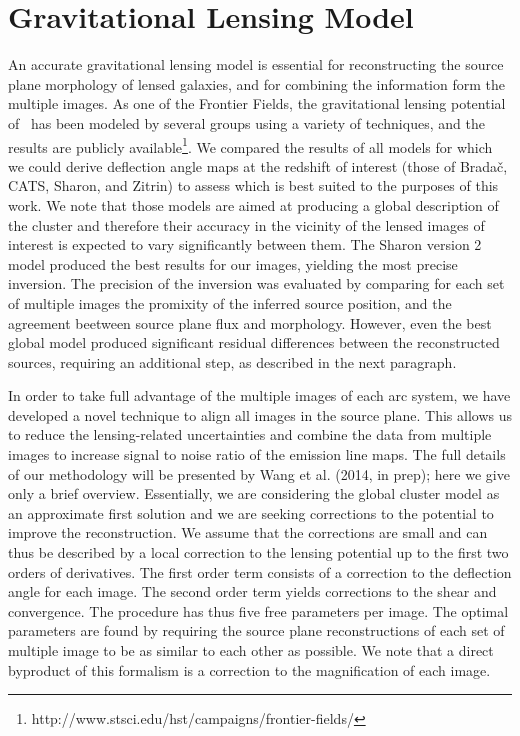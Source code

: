 \section{Gravitational Lensing Model}\label{sec:model}

An accurate gravitational lensing model is essential for reconstructing the source plane morphology of lensed
galaxies, and for combining the information form the multiple images. As one of the Frontier Fields, the
gravitational lensing potential of \clyi\ has been modeled by several groups using a variety of techniques, and
the results are publicly available\footnote{http://www.stsci.edu/hst/campaigns/frontier-fields/}. We compared the
results of all models for which we could derive deflection angle maps at the redshift of interest (those of
Brada{\v c}, CATS, Sharon, and Zitrin) to assess which is best suited to the purposes of this work. We note that
those models are aimed at producing a global description of the cluster and therefore their accuracy in the
vicinity of the lensed images of interest is expected to vary significantly between them. The Sharon version 2
model \citep{Johnson2014} produced the best results for our images, yielding the most precise inversion. The
precision of the inversion was evaluated by comparing for each set of multiple images the promixity of the
inferred source position, and the agreement beetween source plane flux and morphology.  However, even the best
global model produced significant residual differences between the reconstructed sources, requiring an additional
step, as described in the next paragraph.

In order to take full advantage of the multiple images of each arc system, we have developed a novel technique to
align all images in the source plane. This allows us to reduce the lensing-related uncertainties and combine the
data from multiple images to increase signal to noise ratio of the emission line maps. The full details of our
methodology will be presented by Wang et al. (2014, in prep); here we give only a brief overview. Essentially, we
are considering the global cluster model as an approximate first solution and we are seeking corrections to the
potential to improve the reconstruction. We assume that the corrections are small and can thus be described by a
local correction to the lensing potential  up to the first two orders of derivatives.  The first order term
consists of a correction to the deflection angle for each image. The second order term yields corrections to the
shear and convergence. The procedure has thus five free parameters per image. The optimal parameters are found by
requiring the source plane reconstructions of each set of multiple image to be as similar to each other as
possible. We note that a direct byproduct of this formalism is a correction to the magnification of each image.

